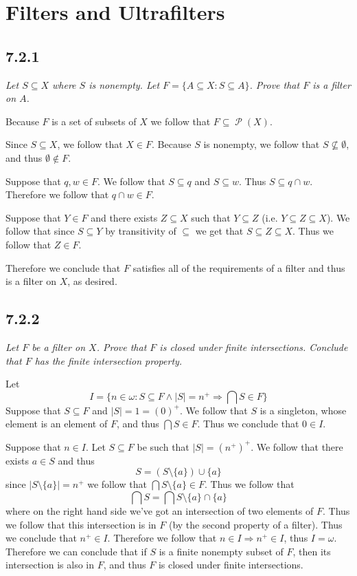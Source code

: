 \documentclass[11pt,oneside,titlepage]{book}
\DeclareMathOperator \pow {\mathcal {P}}
\DeclareMathOperator \ra {\Rightarrow}
\newcommand{\set}[1]{\{ #1 \}}
\begin{document}
\section{Filters and Ultrafilters}

\subsection*{7.2.1}

\textit{Let $S \subseteq X$ where $S$ is nonempty. Let $F = \set{A \subseteq X: S \subseteq A}$.
  Prove that $F$ is a filter on $A$.}

Because $F$ is a set of subsets of $X$ we follow that $F \subseteq \pow(X)$. 

Since $S \subseteq X$, we follow that $X \in F$. Because $S$ is nonempty, we follow that
$S \not \subseteq \emptyset$, and thus $\emptyset \notin F$.

Suppose that $q, w \in F$. We follow that $S \subseteq q$ and $S \subseteq w$. Thus
$S \subseteq q \cap w$. Therefore we follow that $q \cap w \in F$.

Suppose that $Y \in F$ and there exists $Z \subseteq X$ such that $Y \subseteq Z$
(i.e. $Y \subseteq Z \subseteq X$). We follow that since $S \subseteq Y$ by
transitivity of $\subseteq$ we get that $S \subseteq Z \subseteq X$. Thus we follow that
$Z \in F$.

Therefore we conclude that $F$ satisfies all of the requirements of a filter and thus is a
filter on $X$, as desired.

\subsection*{7.2.2}

\textit{Let $F$ be a filter on $X$. Prove that $F$ is closed under finite intersections.
  Conclude that $F$ has the finite intersection property.}

Let
$$I = \set{n \in \omega: S \subseteq F \land |S| = n^+ \ra \bigcap{S} \in F}$$
Suppose that $S \subseteq F$ and $|S| = 1 = (0)^+$. We follow that $S$ is a singleton,
whose element is an element of $F$, and thus $\bigcap{S} \in F$. Thus we conclude that
$0 \in I$.

Suppose that $n \in I$. Let $S \subseteq F$ be such that $|S| = (n^+)^+$.
We follow that there exists $a \in S$ and thus
$$S = (S \setminus \set{a}) \cup \set{a}$$
since $|S \setminus \set{a}| = n^+$ we follow that $\bigcap{S \setminus \set{a}} \in F$.
Thus we follow that
$$\bigcap{S} = \bigcap{S \setminus \set{a}} \cap \set{a}$$
where on the right hand side we've got an intersection of two elements of $F$. Thus we
follow that this intersection is in $F$ (by the second property of a filter). Thus we
conclude that $n^+ \in I$. Therefore we follow that $n \in I \ra n^+ \in I$, thus
$I = \omega$. Therefore we can conclude that if $S$ is a finite nonempty subset of $F$,
then its intersection is also in $F$, and thus $F$ is closed under finite intersections.
\end{document}
